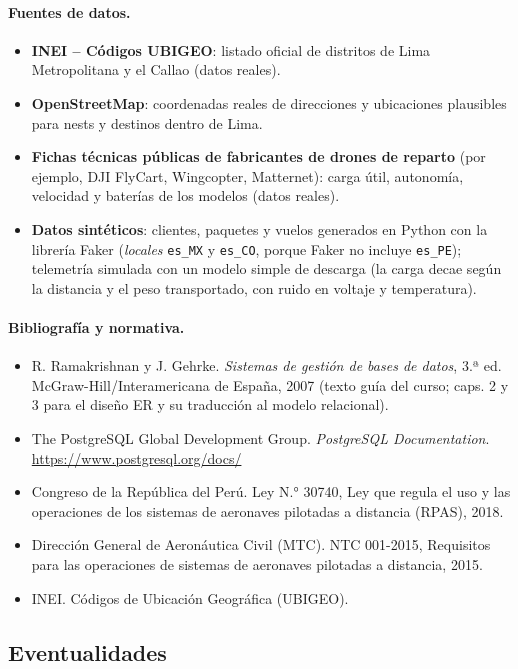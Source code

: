\documentclass[11pt,a4paper]{article}
\begin{document}
\paragraph{Fuentes de datos.}
\begin{itemize}
\item \textbf{INEI -- Códigos UBIGEO}: listado oficial de distritos de Lima Metropolitana y el Callao (datos reales).
\item \textbf{OpenStreetMap}: coordenadas reales de direcciones y ubicaciones plausibles para nests y destinos dentro de Lima.
\item \textbf{Fichas técnicas públicas de fabricantes de drones de reparto} (por ejemplo, DJI FlyCart, Wingcopter, Matternet): carga útil, autonomía, velocidad y baterías de los modelos (datos reales).
\item \textbf{Datos sintéticos}: clientes, paquetes y vuelos generados en Python con la librería Faker (\textit{locales} \texttt{es\_MX} y \texttt{es\_CO}, porque Faker no incluye \texttt{es\_PE}); telemetría simulada con un modelo simple de descarga (la carga decae según la distancia y el peso transportado, con ruido en voltaje y temperatura).
\end{itemize}

\paragraph{Bibliografía y normativa.}
\begin{itemize}
\item R. Ramakrishnan y J. Gehrke. \textit{Sistemas de gestión de bases de datos}, 3.ª ed. McGraw-Hill/Interamericana de España, 2007 (texto guía del curso; caps. 2 y 3 para el diseño ER y su traducción al modelo relacional).
\item The PostgreSQL Global Development Group. \textit{PostgreSQL Documentation}. \url{https://www.postgresql.org/docs/}
\item Congreso de la República del Perú. Ley N.° 30740, Ley que regula el uso y las operaciones de los sistemas de aeronaves pilotadas a distancia (RPAS), 2018.
\item Dirección General de Aeronáutica Civil (MTC). NTC 001-2015, Requisitos para las operaciones de sistemas de aeronaves pilotadas a distancia, 2015.
\item INEI. Códigos de Ubicación Geográfica (UBIGEO).
\end{itemize}

\subsection{Eventualidades}
\end{document}
